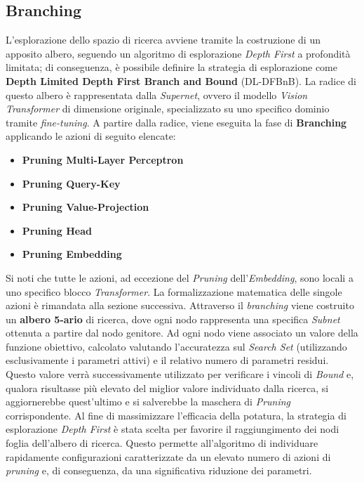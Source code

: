 \subsection{Branching}
L'esplorazione dello spazio di ricerca avviene tramite la costruzione di un
apposito albero, seguendo un algoritmo di esplorazione \textit{Depth First} a
profondità limitata; di conseguenza, è possibile definire la strategia di
esplorazione come \textbf{Depth Limited Depth First Branch and Bound}
(DL-DFBnB). \newline La radice di questo albero è rappresentata dalla
\textit{Supernet}, ovvero il modello \textit{Vision Transformer} di dimensione
originale, specializzato su uno specifico dominio tramite \textit{fine-tuning}.
A partire dalla radice, viene eseguita la fase di \textbf{Branching} applicando
le azioni di seguito elencate:
\begin{itemize}
    \item \textbf{Pruning Multi-Layer Perceptron}
    \item \textbf{Pruning Query-Key}
    \item \textbf{Pruning Value-Projection}
    \item \textbf{Pruning Head}
    \item \textbf{Pruning Embedding}
\end{itemize}
Si noti che tutte le azioni, ad eccezione del \textit{Pruning} dell'\textit{Embedding}, sono locali a uno specifico blocco \textit{Transformer}. La formalizzazione matematica delle singole azioni è rimandata alla sezione successiva. \newline
Attraverso il \textit{branching} viene costruito un \textbf{albero 5-ario} di ricerca, dove ogni nodo rappresenta una specifica \textit{Subnet} ottenuta a partire dal nodo genitore. Ad ogni nodo viene associato un valore della funzione obiettivo, calcolato valutando l'accuratezza sul \textit{Search Set} (utilizzando esclusivamente i parametri attivi) e il relativo numero di parametri residui. Questo valore verrà successivamente utilizzato per verificare i vincoli di \textit{Bound} e, qualora risultasse più elevato del miglior valore individuato dalla ricerca, si aggiornerebbe quest'ultimo e si salverebbe la maschera di \textit{Pruning} corrispondente. \newline
Al fine di massimizzare l'efficacia della potatura, la strategia di esplorazione \textit{Depth First} è stata scelta per favorire il raggiungimento dei nodi foglia dell'albero di ricerca. Questo permette all'algoritmo di individuare rapidamente configurazioni caratterizzate da un elevato numero di azioni di \textit{pruning} e, di conseguenza, da una significativa riduzione dei parametri.\newline
